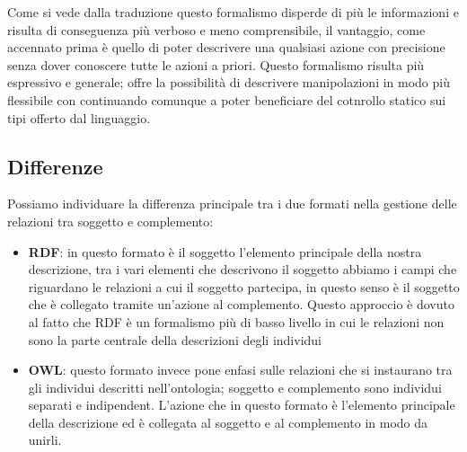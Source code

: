 		 Come si vede dalla traduzione questo formalismo disperde di più le informazioni e risulta di conseguenza più verboso e meno comprensibile, il vantaggio, come accennato prima è quello di poter descrivere una qualsiasi azione con precisione senza dover conoscere tutte le azioni a priori. Questo formalismo risulta più espressivo e generale; offre la possibilità di descrivere manipolazioni in modo più flessibile con \cduce continuando comunque a poter beneficiare del cotnrollo statico sui tipi offerto dal linguaggio.
		 
	\subsection{Differenze}
		Possiamo individuare la differenza principale tra i due formati nella gestione delle relazioni tra soggetto e complemento:
		\begin{itemize}
			\item \textbf{RDF}: in questo formato è il soggetto l'elemento principale della nostra descrizione, tra i vari elementi che descrivono il soggetto abbiamo i campi che riguardano le relazioni a cui il soggetto partecipa, in questo senso è il soggetto che è collegato tramite un'azione al complemento. Questo approccio è dovuto al fatto che RDF è un formalismo più di basso livello in cui le relazioni non sono la parte centrale della descrizioni degli individui
			\item \textbf{OWL}: questo formato invece pone enfasi sulle relazioni che si instaurano tra gli individui descritti nell'ontologia; soggetto e complemento sono individui separati e indipendent. L'azione che in questo formato è l'elemento principale della descrizione ed è collegata al soggetto e al complemento in modo da unirli.
		\end{itemize}